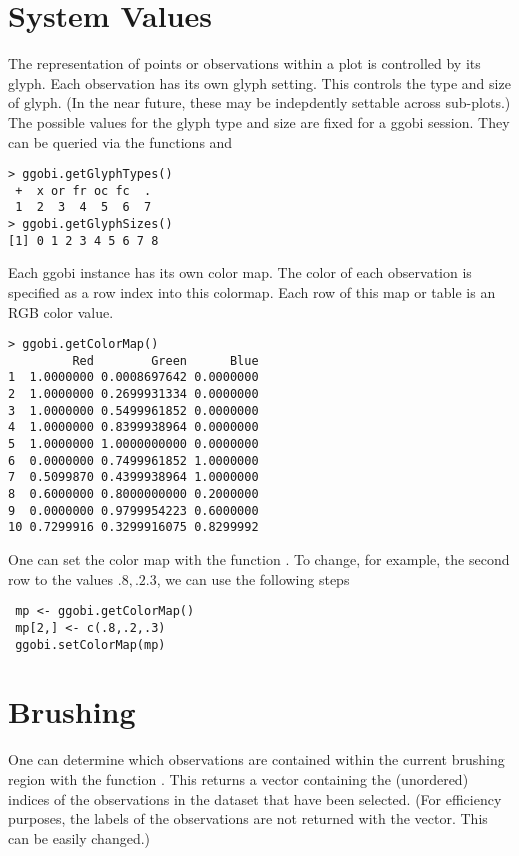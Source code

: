 \documentclass{article}
\begin{document}
\section{}


\section{System Values}
The representation of points or observations within a plot is
controlled by its glyph.  Each observation has its own glyph
setting. This controls the type  and size of glyph.
(In the near future, these may be indepdently settable across
sub-plots.)
The possible values for the glyph type and size
are fixed for a ggobi session.
They can be queried via the functions
and 

\begin{verbatim}
> ggobi.getGlyphTypes()
 +  x or fr oc fc  . 
 1  2  3  4  5  6  7 
> ggobi.getGlyphSizes()
[1] 0 1 2 3 4 5 6 7 8
\end{verbatim}

Each ggobi instance has its own color map.  The color of each
observation is specified as a row index into this colormap.  Each row
of this map or table is an RGB color value.

\begin{verbatim}
> ggobi.getColorMap()
         Red        Green      Blue
1  1.0000000 0.0008697642 0.0000000
2  1.0000000 0.2699931334 0.0000000
3  1.0000000 0.5499961852 0.0000000
4  1.0000000 0.8399938964 0.0000000
5  1.0000000 1.0000000000 0.0000000
6  0.0000000 0.7499961852 1.0000000
7  0.5099870 0.4399938964 1.0000000
8  0.6000000 0.8000000000 0.2000000
9  0.0000000 0.9799954223 0.6000000
10 0.7299916 0.3299916075 0.8299992
\end{verbatim}

One can set the color map with the function
.  To change, for example, the second row
to the values $.8, .2. 3$, we can use the following steps
\begin{verbatim}
 mp <- ggobi.getColorMap()
 mp[2,] <- c(.8,.2,.3)
 ggobi.setColorMap(mp)
\end{verbatim}



\section{Brushing}
One can determine which observations are contained within the current
brushing region with the function
.  This returns a vector
containing the (unordered) indices of the observations in the dataset
that have been selected.  
(For efficiency purposes, the labels of the observations
are not returned with the vector. This can be easily changed.)
\end{document}
